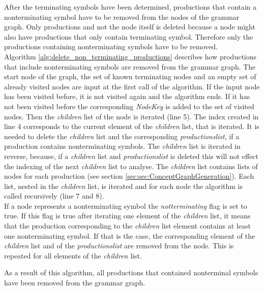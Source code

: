 After the terminating symbols have been determined, productions that contain a nonterminating symbol have to be removed from the nodes of the grammar graph. Only productions and not the node itself is deleted because a node might also have productions that only contain terminating symbol. Therefore only the productions containing nonterminating symbols have to be removed.\\
Algorithm \ref{alg:delete_non_terminating_productions}  describes how productions that include nonterminating symbols are removed from the grammar graph.
The start node of the graph, the set of known terminating nodes and an empty set of already visited nodes are input at the first call of the algorithm.
If the input node has been visited before, it is not visited again and the algorithm ends.
If it has not been visited before the corresponding \textit{Node\textunderscore Key} is added to the set of visited nodes.
Then the \textit{children} list of the node is iterated (line 5).
The index created in line 4 corresponds to the current element of the \textit{children} list, that is iterated.
It is needed to delete the \textit{children} list and the corresponding \textit{productions\textunderscore list}, if a production contains nonterminating symbols. The \textit{children} list is iterated in reverse, because, if a \textit{children} list and \textit{productions\textunderscore list} is deleted this will not effect the indexing of the next \textit{children} list to analyse.
The \textit{children} list contains lists of nodes for each production (see section \ref{sec:sec:ConceptGraphGeneration}). Each list, nested in the \textit{children} list, is iterated and for each node the algorithm is called recursively (line 7 and 8).\\
If a node represents a nonterminating symbol the \textit{not\textunderscore terminating} flag is set to true.
If this flag is true after iterating one element of the \textit{children} list, it means that the production corresponding to the \textit{children} list element contains at least one nonterminating symbol.
If that is the case, the corresponding element of the \textit{children} list and of the \textit{productions\textunderscore list} are removed from the node.
This is repeated for all elements of the \textit{children} list.

As a result of this algorithm, all productions that contained nonterminal symbols have been removed from the grammar graph.

